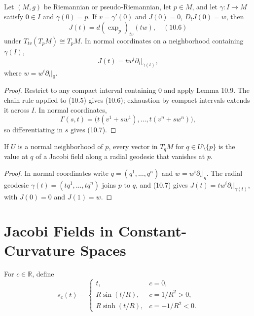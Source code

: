 \begin{proposition}
\label{prop:jacobi-fields-vanishing-at-point}
Let $(M,g)$ be Riemannian or pseudo-Riemannian, let $p\in M$, and let
$\gamma:I\to M$ satisfy $0\in I$ and $\gamma(0)=p$.  If
$v=\gamma'(0)$ and $J(0)=0$, $D_tJ(0)=w$, then
\[
J(t)=d(\exp_p)_{tv}(tw), \quad (10.6)
\]
under $T_{tv}(T_pM)\cong T_pM$.  In normal coordinates on a neighborhood
containing $\gamma(I)$,
\begin{equation}
J(t)=tw^i\partial_i\bigg|_{\gamma(t)}, \tag{10.7}
\end{equation}
where $w=w^i\partial_i|_0$.
\end{proposition}

\begin{proof}
\sketch
Restrict to any compact interval containing $0$ and apply Lemma 10.9.  The
chain rule applied to (10.5) gives (10.6); exhaustion by compact intervals
extends it across $I$.  In normal coordinates,
\[
\Gamma(s,t)=\bigl(t(v^1+sw^1),\ldots,t(v^n+sw^n)\bigr),
\]
so differentiating in $s$ gives (10.7).
\end{proof}

\begin{corollary}
\label{cor:jacobi-field-tangent-vectors}
If $U$ is a normal neighborhood of $p$, every vector in $T_qM$ for
$q\in U\setminus\{p\}$ is the value at $q$ of a Jacobi field along a radial
geodesic that vanishes at $p$.
\end{corollary}

\begin{proof}
\sketch
In normal coordinates write $q=(q^1,\ldots,q^n)$ and
$w=w^i\partial_i|_q$.  The radial geodesic
$\gamma(t)=(tq^1,\ldots,tq^n)$ joins $p$ to $q$, and (10.7) gives
$J(t)=tw^i\partial_i|_{\gamma(t)}$, with $J(0)=0$ and $J(1)=w$.
\end{proof}

\section{Jacobi Fields in Constant-Curvature Spaces}

For $c\in\mathbb R$, define
\begin{equation}
s_c(t)=\begin{cases}
t,&c=0,\\
R\sin(t/R),&c=1/R^2>0,\\
R\sinh(t/R),&c=-1/R^2<0.
\end{cases} \tag{10.8}
\end{equation}

